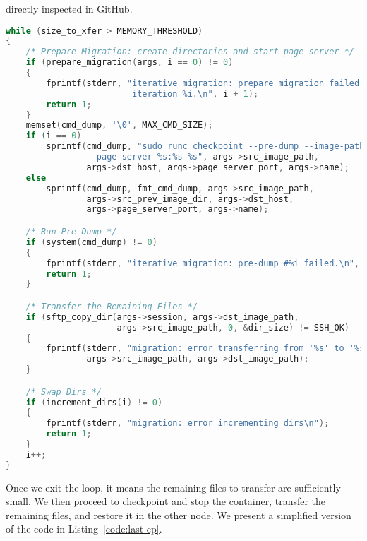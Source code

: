 directly inspected in GitHub.
\begin{lstlisting}[language=C,caption={Iterative migration internal loop.},label={code:iterative-loop}]
while (size_to_xfer > MEMORY_THRESHOLD)
{
    /* Prepare Migration: create directories and start page server */
    if (prepare_migration(args, i == 0) != 0)
    {
        fprintf(stderr, "iterative_migration: prepare migration failed at \
                         iteration %i.\n", i + 1);
        return 1;
    }
    memset(cmd_dump, '\0', MAX_CMD_SIZE);
    if (i == 0)
        sprintf(cmd_dump, "sudo runc checkpoint --pre-dump --image-path %s \
                --page-server %s:%s %s", args->src_image_path, 
                args->dst_host, args->page_server_port, args->name);
    else
        sprintf(cmd_dump, fmt_cmd_dump, args->src_image_path,
                args->src_prev_image_dir, args->dst_host,
                args->page_server_port, args->name);

    /* Run Pre-Dump */
    if (system(cmd_dump) != 0)
    {
        fprintf(stderr, "iterative_migration: pre-dump #%i failed.\n", i);
        return 1;
    }

    /* Transfer the Remaining Files */
    if (sftp_copy_dir(args->session, args->dst_image_path, 
                      args->src_image_path, 0, &dir_size) != SSH_OK)
    {
        fprintf(stderr, "migration: error transferring from '%s' to '%s'\n",
                args->src_image_path, args->dst_image_path);
    }

    /* Swap Dirs */
    if (increment_dirs(i) != 0)
    {
        fprintf(stderr, "migration: error incrementing dirs\n");
        return 1;
    }
    i++;
}
\end{lstlisting}
Once we exit the loop, it means the remaining files to transfer are
sufficiently small.
We then proceed to checkpoint and stop the container, transfer the remaining
files, and restore it in the other node.
We present a simplified version of the code in Listing~\ref{code:last-cp}.
